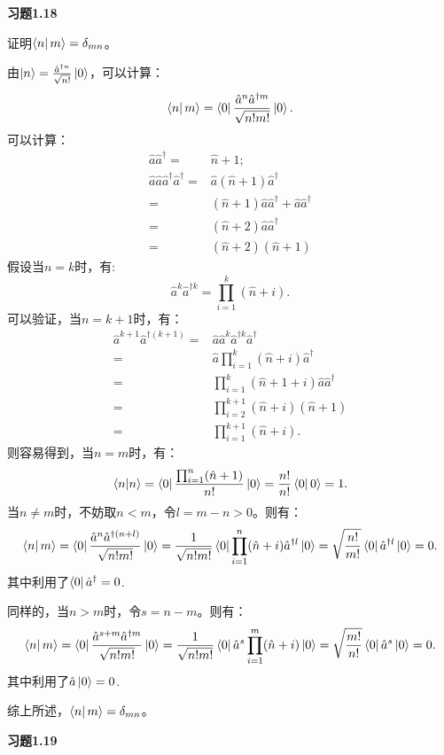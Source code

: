 \documentclass[reqno,a4paper,12pt]{amsart}
\begin{document}
\textbf{习题1.18}

证明$\bra{n} m \rangle = \delta_{mn}$。
\begin{tcolorbox}[breakable, colback = black!5!white, colframe = black]
由$\ket{n} = \frac{\hat{a}^{\dagger n}}{\sqrt{n!}}\ket{0}$，可以计算：
\[
	\bra{n} m \rangle = \bra{0} \frac{\hat{a}^n \hat{a}^{\dagger m}}{\sqrt{n!m!}} \ket{0}.
\]
可以计算：
\begin{align*}
	\hat{a}\hat{a}^\dagger =& \hat{n}+1; \\
	\hat{a}\hat{a}\hat{a}^\dagger\hat{a}^\dagger =& \hat{a}(\hat{n}+1)\hat{a}^\dagger \\
	=& (\hat{n}+1)\hat{a}\hat{a}^\dagger + \hat{a}\hat{a}^\dagger \\
	=& (\hat{n}+2)\hat{a}\hat{a}^\dagger \\
	=& (\hat{n}+2)(\hat{n}+1)
\end{align*}
假设当$n=k$时，有:
\[
	\hat{a}^k\hat{a}^{\dagger k} = \prod_{i=1}^k(\hat{n}+i).
\]
可以验证，当$n=k+1$时，有：
\begin{align*}
	\hat{a}^{k+1}\hat{a}^{\dagger (k+1)} =& \hat{a}\hat{a}^k\hat{a}^{\dagger k}\hat{a}^\dagger \\
	=& \hat{a} \prod_{i=1}^k(\hat{n}+i) \hat{a}^\dagger \\
	=& \prod_{i=1}^k(\hat{n}+1+i)\hat{a}\hat{a}^\dagger \\
	=& \prod_{i=2}^{k+1}(\hat{n}+i)(\hat{n}+1) \\
	=& \prod_{i=1}^{k+1} (\hat{n}+i).
\end{align*}
则容易得到，当$n=m$时，有：
\[
	\langle n \vert n \rangle = \bra{0} \frac{\prod_{i=1}^n (\hat{n}+1)}{n!} \ket{0} = \frac{n!}{n!} \bra{0} 0 \rangle = 1.
\]
当$n\neq m$时，不妨取$n < m$，令$l=m-n>0$。则有：
\[
	\bra{n} m \rangle = \bra{0} \frac{\hat{a}^n\hat{a}^{\dagger (n+l)}}{\sqrt{n!m!}} \ket{0} = \frac{1}{\sqrt{n!m!}} \bra{0} \prod_{i=1}^n (\hat{n}+i) \hat{a}^{\dagger l} \ket{0} = \sqrt{\frac{n!}{m!}} \bra{0} \hat{a}^{\dagger l} \ket{0} = 0.
\]
其中利用了$\bra{0} \hat{a}^\dagger = 0$.

同样的，当$n>m$时，令$s = n-m$。则有：
\[
	\bra{n} m \rangle = \bra{0} \frac{\hat{a}^{s+m}\hat{a}^{\dagger m}}{\sqrt{n!m!}} \ket{0} = \frac{1}{\sqrt{n!m!}} \bra{0} \hat{a}^s \prod_{i=1}^m (\hat{n}+i) \ket{0} = \sqrt{\frac{m!}{n!}} \bra{0} \hat{a}^s \ket{0} = 0.
\]
其中利用了$\hat{a} \ket{0} = 0$.

综上所述，$\bra{n} m \rangle = \delta_{mn}$。
\end{tcolorbox}

\textbf{习题1.19}
\end{document}
